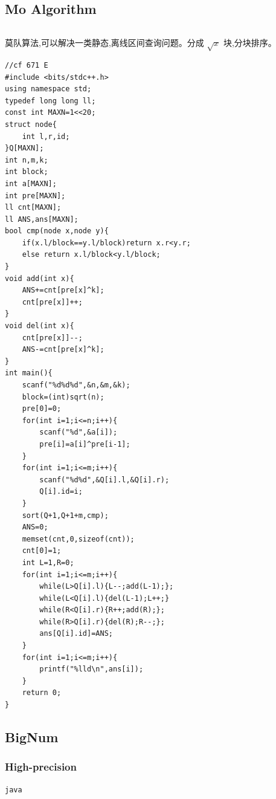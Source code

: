 \documentclass[twoside]{article}
\begin{document}
\subsection{Mo Algorithm}
\begin{lstlisting}
\end{lstlisting}
莫队算法,可以解决一类静态,离线区间查询问题。分成 $\sqrt{x}$ 块,分块排序。
\begin{lstlisting}
//cf 671 E
#include <bits/stdc++.h>
using namespace std;
typedef long long ll;
const int MAXN=1<<20;
struct node{
    int l,r,id;
}Q[MAXN];
int n,m,k;
int block;
int a[MAXN];
int pre[MAXN];
ll cnt[MAXN];
ll ANS,ans[MAXN];
bool cmp(node x,node y){
    if(x.l/block==y.l/block)return x.r<y.r;
    else return x.l/block<y.l/block;
}
void add(int x){
    ANS+=cnt[pre[x]^k];
    cnt[pre[x]]++;
}
void del(int x){
    cnt[pre[x]]--;
    ANS-=cnt[pre[x]^k];
}
int main(){
    scanf("%d%d%d",&n,&m,&k);
    block=(int)sqrt(n);
    pre[0]=0;
    for(int i=1;i<=n;i++){
        scanf("%d",&a[i]);
        pre[i]=a[i]^pre[i-1];
    }
    for(int i=1;i<=m;i++){
        scanf("%d%d",&Q[i].l,&Q[i].r);
        Q[i].id=i;
    }
    sort(Q+1,Q+1+m,cmp);
    ANS=0;
    memset(cnt,0,sizeof(cnt));
    cnt[0]=1;
    int L=1,R=0;
    for(int i=1;i<=m;i++){
        while(L>Q[i].l){L--;add(L-1);};
        while(L<Q[i].l){del(L-1);L++;}
        while(R<Q[i].r){R++;add(R);};
        while(R>Q[i].r){del(R);R--;};
        ans[Q[i].id]=ANS;
    }
    for(int i=1;i<=m;i++){
        printf("%lld\n",ans[i]);
    }
    return 0;
}
\end{lstlisting}
\subsection{BigNum}
\subsubsection{High-precision}
\begin{lstlisting}
java
\end{lstlisting}
\end{document}
